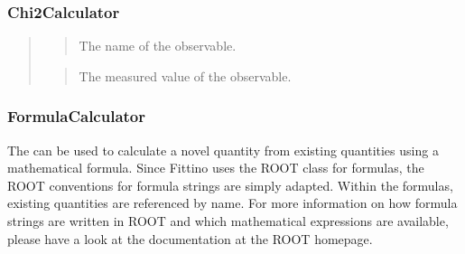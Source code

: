 \documentclass[letterpaper,10pt,english]{sphinxmanual}
\begin{document}
\subsubsection{Chi2Calculator}
\label{chi2_calculator:chi2calculator}\label{chi2_calculator::doc}
\begin{quote}

\begin{quote}

The name of the observable.
\end{quote}

\begin{quote}

The measured value of the observable.
\end{quote}


\begin{quote}


\end{quote}




\end{quote}

\begin{quote}



\end{quote}


\subsubsection{FormulaCalculator}
\label{formula_calculator::doc}\label{formula_calculator:formulacalculator}
The  can be used to calculate a novel quantity from existing quantities using a
mathematical formula. Since Fittino uses the ROOT class  for formulas, the ROOT
conventions for formula strings are simply adapted. Within the formulas, existing quantities are
referenced by name. For more information on how formula strings are written in ROOT and which
mathematical expressions are available, please have a look at the documentation at the ROOT
homepage.
\end{document}
